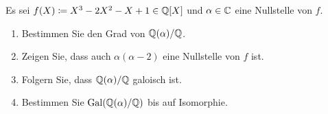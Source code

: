\begin{question}[subtitle = Galoisgruppe von $X^3 - 2 X^2 - X + 1$]
  Es sei $f(X) \coloneqq X^3 - 2 X^2 - X + 1 \in \mathbb{Q}[X]$ und $\alpha \in \mathbb{C}$ eine Nullstelle von $f$.
  \begin{enumerate}
    \item
      Bestimmen Sie den Grad von $\mathbb{Q}(\alpha) / \mathbb{Q}$.
    \item
      Zeigen Sie, dass auch $\alpha(\alpha-2)$ eine Nullstelle von $f$ ist.
    \item
      Folgern Sie, dass $\mathbb{Q}(\alpha)/\mathbb{Q}$ galoisch ist.
    \item
      Bestimmen Sie $\operatorname{Gal}(\mathbb{Q}(\alpha)/\mathbb{Q})$ bis auf Isomorphie.
  \end{enumerate}
\end{question}


